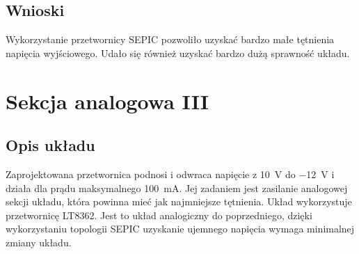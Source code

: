 \documentclass[11pt]{article}
\begin{document}
\subsection{Wnioski}
Wykorzystanie przetwornicy SEPIC pozwoliło uzyskać bardzo małe tętnienia napięcia wyjściowego. Udało się również uzyskać bardzo dużą sprawność układu.


\section{Sekcja analogowa III}
\subsection{Opis układu}
Zaprojektowana przetwornica podnosi i odwraca napięcie z \SI{10}{\V} do \SI{-12}{\V} i działa dla prądu maksymalnego \SI{100}{\milli\A}. Jej zadaniem jest zasilanie analogowej sekcji układu, która powinna mieć jak najmniejsze tętnienia. Układ wykorzystuje przetwornicę LT8362. Jest to układ analogiczny do poprzedniego, dzięki wykorzystaniu topologii SEPIC uzyskanie ujemnego napięcia wymaga minimalnej zmiany układu.
\end{document}
